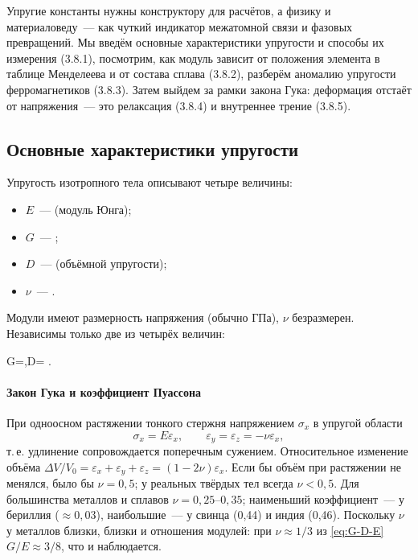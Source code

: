\begin{orientir}
Упругие константы нужны конструктору для расчётов, а физику и
материаловеду~— как чуткий индикатор межатомной связи и фазовых
превращений. Мы введём основные характеристики упругости и способы их
измерения (3.8.1), посмотрим, как модуль зависит от положения элемента в
таблице Менделеева и от состава сплава (3.8.2), разберём аномалию
упругости ферромагнетиков (3.8.3). Затем выйдем за рамки закона Гука:
деформация отстаёт от напряжения~— это релаксация (3.8.4) и внутреннее
трение (3.8.5).
\end{orientir}

\subsection{Основные характеристики упругости}\label{ssec:elastic-const}

Упругость изотропного тела описывают четыре величины:
\begin{itemize}
\item $E$~—  (модуль Юнга);
\item $G$~— ;
\item $D$~—  (объёмной упругости);
\item $\nu$~— .
\end{itemize}
Модули имеют размерность напряжения (обычно ГПа), $\nu$ безразмерен.
Независимы только две из четырёх величин:
\begin{keyeq}\label{eq:G-D-E}
G=,\qquad D= .
\end{keyeq}

\paragraph{Закон Гука и коэффициент Пуассона}
При одноосном растяжении тонкого стержня напряжением $\sigma_x$ в упругой
области
\begin{equation}\label{eq:hooke-rod}
\sigma_x=E\varepsilon_x,\qquad \varepsilon_y=\varepsilon_z=-\nu\varepsilon_x ,
\end{equation}
т.\,е. удлинение сопровождается поперечным сужением. Относительное
изменение объёма
$\Delta V/V_0=\varepsilon_x+\varepsilon_y+\varepsilon_z=(1-2\nu)\varepsilon_x$.
Если бы объём при растяжении не менялся, было бы $\nu=0{,}5$; у реальных
твёрдых тел всегда $\nu<0{,}5$. Для большинства металлов и сплавов
$\nu=0{,}25$--$0{,}35$; наименьший коэффициент~— у бериллия
(${\approx}0{,}03$), наибольшие~— у свинца (0,44) и индия (0,46). Поскольку $\nu$
у металлов близки, близки и отношения модулей: при $\nu\approx1/3$ из
\eqref{eq:G-D-E} $G/E\approx3/8$, что и наблюдается.


